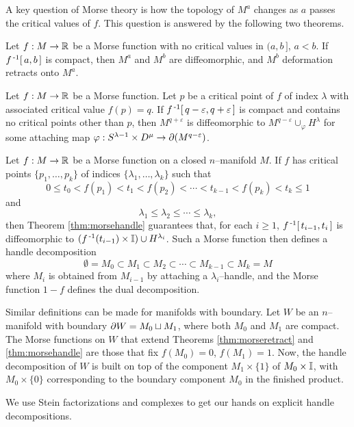 A key question of Morse theory is how the topology of $M^a$ changes as $a$ passes the critical values of $f$.
This question is answered by the following two theorems.

\begin{theorem}
	\label{thm:morseretract}
	Let $f:M\to\mathbb{R}$ be a Morse function with no critical values in $(a,b\,]$, $a<b$.
	If $f^{\,\text{-}1}[\,a,b\,]$ is compact, then $M^a$ and $M^b$ are diffeomorphic, and $M^b$ deformation retracts onto $M^a$.
\end{theorem}

\begin{theorem}
	\label{thm:morsehandle}
	Let $f:M\to\mathbb{R}$ be a Morse function.
	Let $p$ be a critical point of $f$ of index $\lambda$ with associated critical value $f(p)=q$.
	If $f^{\,\text{-}1}[\,q-\varepsilon, q+\varepsilon\,]$ is compact and contains no critical points other than $p$, then $M^{q+\varepsilon}$ is diffeomorphic to $M^{q-\varepsilon}\cup_\varphi H^\lambda$ for some attaching map $\varphi:S^{\lambda-1}\times D^\mu\to \partial(M^{q-\varepsilon})$.
\end{theorem}

Let $f:M\to\mathbb{R}$ be a Morse function on a closed $n$--manifold $M$.
If $f$ has critical points $\{p_1,\dots,p_k\}$ of indices $\{\lambda_1,\dots,\lambda_k\}$ such that
\[
	0\leq t_0 < f(p_1) < t_1 < f(p_2) < \cdots < t_{k-1} < f(p_k) < t_k \leq 1
\]
and
\[
	\lambda_1 \leq \lambda_2 \leq \cdots \leq \lambda_k,
\]
then Theorem \ref{thm:morsehandle} guarantees that, for each $i\geq 1$, $f^{\,\text{-}1}[\,t_{i-1},t_i\,]$ is diffeomorphic to $(f^{\,\text{-}1}(t_{i-1})\times\mathbb{I})\cup H^{\lambda_i}$.
Such a Morse function then defines a handle decomposition
\[
	\emptyset = M_0 \subset M_1 \subset M_2 \subset \cdots \subset M_{k-1} \subset M_k = M
\]
where $M_i$ is obtained from $M_{i-1}$ by attaching a $\lambda_i$--handle, and the Morse function $1-f$ defines the dual decomposition.

Similar definitions can be made for manifolds with boundary.
Let $W$ be an $n$--manifold with boundary $\partial W = M_0\sqcup M_1$, where both $M_0$ and $M_1$ are compact.
The Morse functions on $W$ that extend Theorems \ref{thm:morseretract} and \ref{thm:morsehandle} are those that fix $f(M_0)=0$, $f(M_1)=1$.
Now, the handle decomposition of $W$ is built on top of the component $M_1\times\{1\}$ of $M_0\times\mathbb{I}$, with $M_0\times\{0\}$ corresponding to the boundary component $M_0$ in the finished product.

We use Stein factorizations and complexes to get our hands on explicit handle decompositions.

